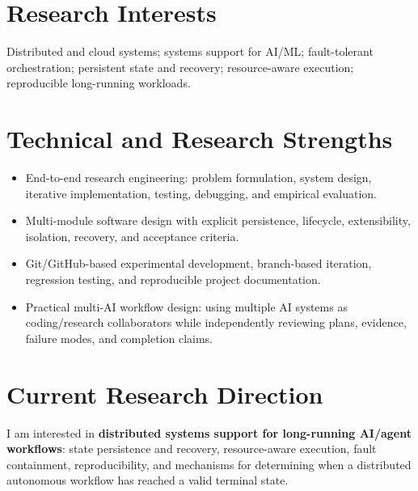 \documentclass[10pt,a4paper]{article}
\begin{document}
\section{Research Interests}
Distributed and cloud systems; systems support for AI/ML; fault-tolerant orchestration; persistent state and recovery; resource-aware execution; reproducible long-running workloads.

\section{Technical and Research Strengths}
\begin{itemize}
  \item End-to-end research engineering: problem formulation, system design, iterative implementation, testing, debugging, and empirical evaluation.
  \item Multi-module software design with explicit persistence, lifecycle, extensibility, isolation, recovery, and acceptance criteria.
  \item Git/GitHub-based experimental development, branch-based iteration, regression testing, and reproducible project documentation.
  \item Practical multi-AI workflow design: using multiple AI systems as coding/research collaborators while independently reviewing plans, evidence, failure modes, and completion claims.
\end{itemize}

\section{Current Research Direction}
I am interested in \textbf{distributed systems support for long-running AI/agent workflows}: state persistence and recovery, resource-aware execution, fault containment, reproducibility, and mechanisms for determining when a distributed autonomous workflow has reached a valid terminal state.
\end{document}
